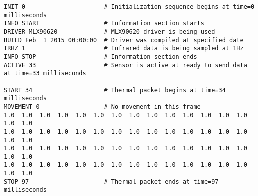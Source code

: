 \begin{verbatim}
INIT 0                      # Initialization sequence begins at time=0 milliseconds
INFO START                  # Information section starts
DRIVER MLX90620             # MLX90620 driver is being used
BUILD Feb  1 2015 00:00:00  # Driver was compiled at specified date
IRHZ 1                      # Infrared data is being sampled at 1Hz
INFO STOP                   # Information section ends
ACTIVE 33                   # Sensor is active at ready to send data at time=33 milliseconds

START 34                    # Thermal packet begins at time=34 milliseconds
MOVEMENT 0                  # No movement in this frame
1.0  1.0  1.0  1.0  1.0  1.0  1.0  1.0  1.0  1.0  1.0  1.0  1.0  1.0  1.0  1.0
1.0  1.0  1.0  1.0  1.0  1.0  1.0  1.0  1.0  1.0  1.0  1.0  1.0  1.0  1.0  1.0
1.0  1.0  1.0  1.0  1.0  1.0  1.0  1.0  1.0  1.0  1.0  1.0  1.0  1.0  1.0  1.0
1.0  1.0  1.0  1.0  1.0  1.0  1.0  1.0  1.0  1.0  1.0  1.0  1.0  1.0  1.0  1.0
STOP 97                     # Thermal packet ends at time=97 milliseconds
\end{verbatim}
